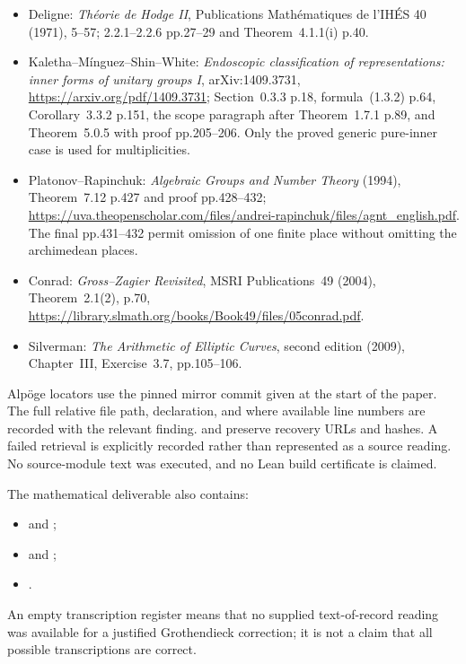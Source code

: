 \documentclass[11pt]{article}
\theoremstyle{definition}\newtheorem{definition}[theorem]{Definition}\newtheorem{remark}[theorem]{Remark}
\begin{document}
\begin{itemize}[leftmargin=*]
{and automorphic vector bundles}, corrected 2018 version of the
1990 work, \url{https://jmilne.org/math/xnotes/AA.pdf};
Chapter III, Remark~2.3 and Example~2.4 pp.55--56,
Theorem~5.1 and Remark~5.2 p.61, Sections~6--7 pp.61--63.
\item Deligne: \emph{Th\'eorie de Hodge II}, Publications
Math\'ematiques de l'IH\'ES 40 (1971), 5--57;
2.2.1--2.2.6 pp.27--29 and Theorem~4.1.1(i) p.40.
\item Kaletha--M\'inguez--Shin--White:
\emph{Endoscopic classification of representations: inner forms
of unitary groups I}, arXiv:1409.3731,
\url{https://arxiv.org/pdf/1409.3731};
Section~0.3.3 p.18, formula~(1.3.2) p.64,
Corollary~3.3.2 p.151, the scope paragraph after
Theorem~1.7.1 p.89, and Theorem~5.0.5 with proof
pp.205--206. Only the proved generic pure-inner case
is used for multiplicities.
\item Platonov--Rapinchuk: \emph{Algebraic Groups and Number
Theory} (1994), Theorem~7.12 p.427 and proof pp.428--432;
\url{https://uva.theopenscholar.com/files/andrei-rapinchuk/files/agnt_english.pdf}.
The final pp.431--432 permit omission of one finite
place without omitting the archimedean places.
\item Conrad: \emph{Gross--Zagier Revisited}, MSRI
Publications~49 (2004), Theorem~2.1(2), p.70,
\url{https://library.slmath.org/books/Book49/files/05conrad.pdf}.
\item Silverman: \emph{The Arithmetic of Elliptic Curves},
second edition (2009), Chapter~III, Exercise~3.7,
pp.105--106.
\end{itemize}

Alp\"oge locators use the pinned mirror commit given at the start
of the paper. The full relative file path, declaration, and where
available line numbers are recorded with the relevant finding.
 and
 preserve recovery
URLs and hashes. A failed retrieval is explicitly recorded rather
than represented as a source reading. No source-module text was
executed, and no Lean build certificate is claimed.

The mathematical deliverable also contains:
\begin{itemize}[leftmargin=*]
\item {} and ;
\item {} and ;
\item {}.
\end{itemize}
An empty transcription register means that no
supplied text-of-record reading was available for a justified
Grothendieck correction; it is not a claim that all possible
transcriptions are correct.
\end{document}
